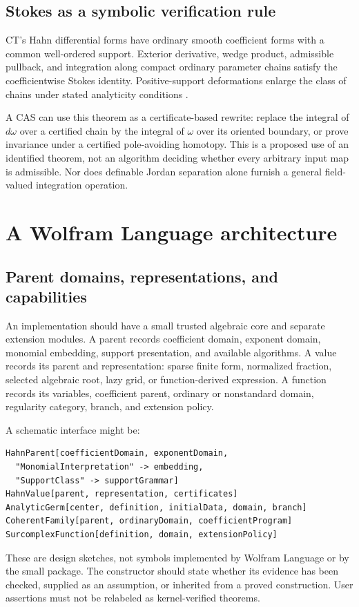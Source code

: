 \documentclass[11pt,letterpaper]{article}
\theoremstyle{definition}\newtheorem{definition}[theorem]{Definition}
\theoremstyle{remark}\newtheorem{remark}[theorem]{Remark}
\numberwithin{equation}{section}\setcounter{tocdepth}{2}
\begin{document}
\subsection{Stokes as a symbolic verification rule}
CT's Hahn differential forms have ordinary smooth coefficient forms with a common well-ordered support. Exterior derivative, wedge product, admissible pullback, and integration along compact ordinary parameter chains satisfy the coefficientwise Stokes identity. Positive-support deformations enlarge the class of chains under stated analyticity conditions \cite{CT}.

A CAS can use this theorem as a certificate-based rewrite: replace the integral of $d\omega$ over a certified chain by the integral of $\omega$ over its oriented boundary, or prove invariance under a certified pole-avoiding homotopy. This is a proposed use of an identified theorem, not an algorithm deciding whether every arbitrary input map is admissible. Nor does definable Jordan separation alone furnish a general field-valued integration operation.

\section{A Wolfram Language architecture}\label{sec:architecture}
\subsection{Parent domains, representations, and capabilities}
An implementation should have a small trusted algebraic core and separate extension modules. A parent records coefficient domain, exponent domain, monomial embedding, support presentation, and available algorithms. A value records its parent and representation: sparse finite form, normalized fraction, selected algebraic root, lazy grid, or function-derived expression. A function records its variables, coefficient parent, ordinary or nonstandard domain, regularity category, branch, and extension policy.

A schematic interface might be:
\par\noindent\begin{minipage}{\textwidth}
\begin{lstlisting}
HahnParent[coefficientDomain, exponentDomain,
  "MonomialInterpretation" -> embedding,
  "SupportClass" -> supportGrammar]
HahnValue[parent, representation, certificates]
AnalyticGerm[center, definition, initialData, domain, branch]
CoherentFamily[parent, ordinaryDomain, coefficientProgram]
SurcomplexFunction[definition, domain, extensionPolicy]
\end{lstlisting}
\end{minipage}\par
These are design sketches, not symbols implemented by Wolfram Language or by the small package. The constructor should state whether its evidence has been checked, supplied as an assumption, or inherited from a proved construction. User assertions must not be relabeled as kernel-verified theorems.
\end{document}
